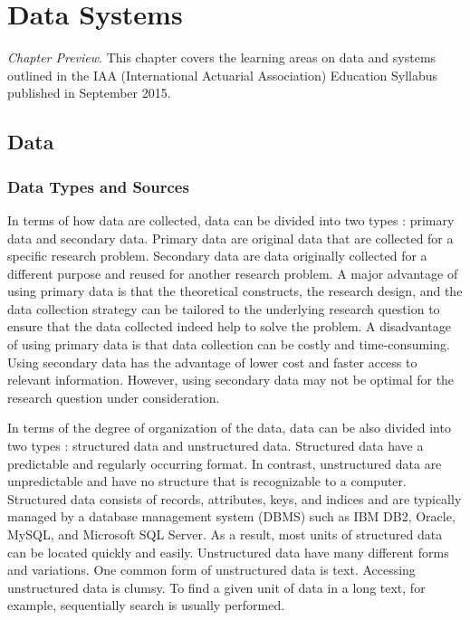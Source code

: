 \documentclass[]{book}
\theoremstyle{definition}
\theoremstyle{definition}
\theoremstyle{definition}
\theoremstyle{remark}
\begin{document}
\chapter{Data Systems}\label{C:DataSystems}

\emph{Chapter Preview}. This chapter covers the learning areas on data
and systems outlined in the IAA (International Actuarial Association)
Education Syllabus published in September 2015.

\section{Data}\label{data}

\subsection{Data Types and Sources}\label{data-types-and-sources}

In terms of how data are collected, data can be divided into two types
\citep{hox2005data}: primary data and secondary data. Primary data are
original data that are collected for a specific research problem.
Secondary data are data originally collected for a different purpose and
reused for another research problem. A major advantage of using primary
data is that the theoretical constructs, the research design, and the
data collection strategy can be tailored to the underlying research
question to ensure that the data collected indeed help to solve the
problem. A disadvantage of using primary data is that data collection
can be costly and time-consuming. Using secondary data has the advantage
of lower cost and faster access to relevant information. However, using
secondary data may not be optimal for the research question under
consideration.

In terms of the degree of organization of the data, data can be also
divided into two types
\citep{inmon2014, leary2013bigdata, hashem2015bigdata, abdullah2013data, pries2015}:
structured data and unstructured data. Structured data have a
predictable and regularly occurring format. In contrast, unstructured
data are unpredictable and have no structure that is recognizable to a
computer. Structured data consists of records, attributes, keys, and
indices and are typically managed by a database management system (DBMS)
such as IBM DB2, Oracle, MySQL, and Microsoft SQL Server. As a result,
most units of structured data can be located quickly and easily.
Unstructured data have many different forms and variations. One common
form of unstructured data is text. Accessing unstructured data is
clumsy. To find a given unit of data in a long text, for example,
sequentially search is usually performed.
\end{document}
